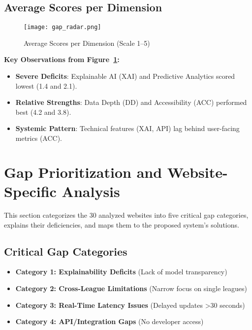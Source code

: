 \subsection{Average Scores per Dimension}
\begin{figure}[h!]
    \centering
    \texttt{[image: gap\_radar.png]}
    \caption{Average Scores per Dimension (Scale 1–5)}
    \label{fig:gap-radar}
\end{figure}
\textbf{Key Observations from Figure~\ref{fig:gap-radar}:}
\begin{itemize}
    \item \textbf{Severe Deficits}: Explainable AI (XAI) and Predictive Analytics scored lowest (1.4 and 2.1).
    \item \textbf{Relative Strengths}: Data Depth (DD) and Accessibility (ACC) performed best (4.2 and 3.8).
    \item \textbf{Systemic Pattern}: Technical features (XAI, API) lag behind user-facing metrics (ACC).
\end{itemize}

\section{Gap Prioritization and Website-Specific Analysis}
This section categorizes the 30 analyzed websites into five critical gap categories, explains their deficiencies, and maps them to the proposed system’s solutions.

\subsection{Critical Gap Categories}
\begin{itemize}
\item \textbf{Category 1: Explainability Deficits} (Lack of model transparency)
\item \textbf{Category 2: Cross-League Limitations} (Narrow focus on single leagues)
\item \textbf{Category 3: Real-Time Latency Issues} (Delayed updates >30 seconds)
\item \textbf{Category 4: API/Integration Gaps} (No developer access)
\end{itemize}

